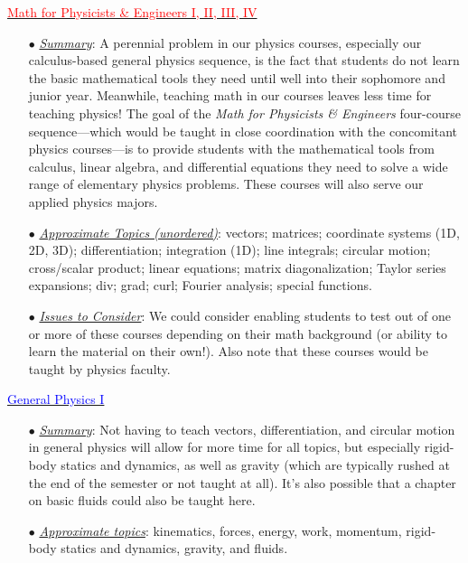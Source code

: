 \documentclass[12pt,preprint]{aastex}
\newcommand{\red}[1]{\textcolor{red}{#1}}
\newcommand{\blue}[1]{\textcolor{blue}{#1}}
\begin{document}
\vspace{-2mm}
\begin{itemize*}
\item{\underline{\red{Math for Physicists \& Engineers I, II, III, IV}}
  \begin{itemize}
    \item[$\bullet$]{\underline{\em Summary}: A perennial problem in our physics
      courses, especially our calculus-based general physics sequence, is the
      fact that students do not learn the basic mathematical tools they need
      until well into their sophomore and junior year.  Meanwhile, teaching math
      in our courses leaves less time for teaching physics!  The goal of the
      {\em Math for Physicists \& Engineers} four-course sequence---which would
      be taught in close coordination with the concomitant physics courses---is
      to provide students with the mathematical tools from calculus, linear
      algebra, and differential equations they need to solve a wide range of
      elementary physics problems.  These courses will also serve our applied
      physics majors.}
    \item[$\bullet$]{\underline{\em Approximate Topics (unordered)}: vectors;
      matrices; coordinate systems (1D, 2D, 3D); differentiation; integration
      (1D); line integrals; circular motion; cross/scalar product; linear
      equations; matrix diagonalization; Taylor series expansions; div; grad;
      curl; Fourier analysis; special functions.}
    \item[$\bullet$]{\underline{\em Issues to Consider}: We could consider
      enabling students to test out of one or more of these courses depending on
      their math background (or ability to learn the material on their own!).
      Also note that these courses would be taught by physics faculty.}
  \end{itemize}
}
\item{\underline{\blue{General Physics I}}
  \begin{itemize}
    \item[$\bullet$]{\underline{\em Summary}: Not having to teach vectors,
      differentiation, and circular motion in general physics will allow for
      more time for all topics, but especially rigid-body statics and dynamics,
      as well as gravity (which are typically rushed at the end of the semester
      or not taught at all).  It's also possible that a chapter on basic fluids
      could also be taught here.}
    \item[$\bullet$]{\underline{\em Approximate topics}: kinematics, forces,
      energy, work, momentum, rigid-body statics and dynamics, gravity, and
      fluids.}
  \end{itemize}
}
  

\end{itemize*}
\end{document}
